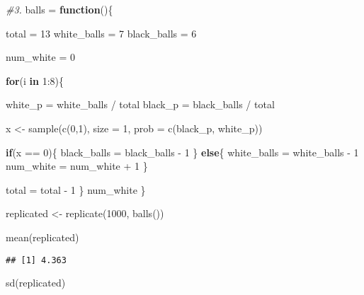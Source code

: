 \documentclass[
]{article}
\newenvironment{Shaded}{\begin{snugshade}}{\end{snugshade}}
\newcommand{\AttributeTok}[1]{\textcolor[rgb]{0.77,0.63,0.00}{#1}}
\newcommand{\CommentTok}[1]{\textcolor[rgb]{0.56,0.35,0.01}{\textit{#1}}}
\newcommand{\ControlFlowTok}[1]{\textcolor[rgb]{0.13,0.29,0.53}{\textbf{#1}}}
\newcommand{\DecValTok}[1]{\textcolor[rgb]{0.00,0.00,0.81}{#1}}
\newcommand{\FunctionTok}[1]{\textcolor[rgb]{0.00,0.00,0.00}{#1}}
\newcommand{\NormalTok}[1]{#1}
\newcommand{\OtherTok}[1]{\textcolor[rgb]{0.56,0.35,0.01}{#1}}
\newcommand{\SpecialCharTok}[1]{\textcolor[rgb]{0.00,0.00,0.00}{#1}}
\begin{document}
\begin{Shaded}
\begin{Highlighting}[]
\CommentTok{\#3.}
\NormalTok{balls }\OtherTok{=} \ControlFlowTok{function}\NormalTok{()\{}
  
\NormalTok{  total }\OtherTok{=} \DecValTok{13}
\NormalTok{  white\_balls }\OtherTok{=} \DecValTok{7}
\NormalTok{  black\_balls }\OtherTok{=} \DecValTok{6}
  
\NormalTok{  num\_white }\OtherTok{=} \DecValTok{0}
  
  \ControlFlowTok{for}\NormalTok{(i }\ControlFlowTok{in} \DecValTok{1}\SpecialCharTok{:}\DecValTok{8}\NormalTok{)\{}
    
\NormalTok{    white\_p }\OtherTok{=}\NormalTok{ white\_balls }\SpecialCharTok{/}\NormalTok{ total}
\NormalTok{    black\_p }\OtherTok{=}\NormalTok{ black\_balls }\SpecialCharTok{/}\NormalTok{ total}
    
\NormalTok{    x }\OtherTok{\textless{}{-}} \FunctionTok{sample}\NormalTok{(}\FunctionTok{c}\NormalTok{(}\DecValTok{0}\NormalTok{,}\DecValTok{1}\NormalTok{), }\AttributeTok{size =} \DecValTok{1}\NormalTok{, }\AttributeTok{prob =} \FunctionTok{c}\NormalTok{(black\_p, white\_p))}
    
    \ControlFlowTok{if}\NormalTok{(x }\SpecialCharTok{==} \DecValTok{0}\NormalTok{)\{}
\NormalTok{      black\_balls }\OtherTok{=}\NormalTok{ black\_balls }\SpecialCharTok{{-}} \DecValTok{1}
\NormalTok{    \}}
    \ControlFlowTok{else}\NormalTok{\{}
\NormalTok{      white\_balls }\OtherTok{=}\NormalTok{ white\_balls }\SpecialCharTok{{-}} \DecValTok{1}
\NormalTok{      num\_white }\OtherTok{=}\NormalTok{ num\_white }\SpecialCharTok{+} \DecValTok{1}
\NormalTok{    \}}
    
\NormalTok{    total }\OtherTok{=}\NormalTok{ total }\SpecialCharTok{{-}} \DecValTok{1}
\NormalTok{  \}}
\NormalTok{  num\_white}
\NormalTok{\}}

\NormalTok{replicated }\OtherTok{\textless{}{-}} \FunctionTok{replicate}\NormalTok{(}\DecValTok{1000}\NormalTok{, }\FunctionTok{balls}\NormalTok{())}


\FunctionTok{mean}\NormalTok{(replicated)}
\end{Highlighting}
\end{Shaded}

\begin{verbatim}
## [1] 4.363
\end{verbatim}

\begin{Shaded}
\begin{Highlighting}[]
\FunctionTok{sd}\NormalTok{(replicated)}
\end{Highlighting}
\end{Shaded}
\end{document}
